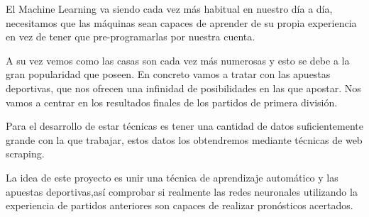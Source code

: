
El Machine Learning va siendo cada vez más habitual en nuestro día a día, necesitamos que las máquinas sean capaces de aprender de su propia experiencia en vez de tener que pre-programarlas por nuestra cuenta.

A su vez vemos como las casas son cada vez más numerosas y esto se debe a la gran popularidad que poseen. En concreto vamos a tratar con las apuestas deportivas, que nos ofrecen una infinidad de posibilidades en las que apostar. Nos vamos a centrar en los resultados finales  de los partidos de primera división.

Para el desarrollo de estar técnicas es tener una cantidad de datos suficientemente grande con la que trabajar, estos datos los obtendremos mediante técnicas de web scraping.

La idea de este proyecto es unir una técnica de aprendizaje automático y las apuestas deportivas,así comprobar si realmente las redes neuronales utilizando la experiencia de partidos anteriores son capaces de realizar pronósticos acertados.





